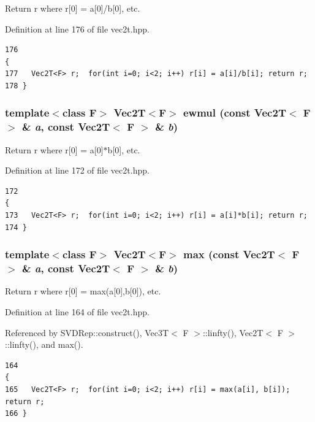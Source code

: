 Return r where r[0] = a[0]/b[0], etc. 

Definition at line 176 of file vec2t.hpp.

\footnotesize\begin{verbatim}176                                                                               { 
177   Vec2T<F> r;  for(int i=0; i<2; i++) r[i] = a[i]/b[i]; return r;
178 }
\end{verbatim}\normalsize 


\subsubsection{\setlength{\rightskip}{0pt plus 5cm}template$<$class F$>$ {\bf Vec2T}$<$F$>$ ewmul (const {\bf Vec2T}$<$ F $>$ \& {\em a}, const {\bf Vec2T}$<$ F $>$ \& {\em b})\hspace{0.3cm}{\tt  [inline]}}\label{vec2t_8hpp_77e0a16eb77d5befc68fcfea9239ad84_77e0a16eb77d5befc68fcfea9239ad84}


Return r where r[0] = a[0]$\ast$b[0], etc. 

Definition at line 172 of file vec2t.hpp.

\footnotesize\begin{verbatim}172                                                                               {
173   Vec2T<F> r;  for(int i=0; i<2; i++) r[i] = a[i]*b[i]; return r;
174 }
\end{verbatim}\normalsize 


\subsubsection{\setlength{\rightskip}{0pt plus 5cm}template$<$class F$>$ {\bf Vec2T}$<$F$>$ max (const {\bf Vec2T}$<$ F $>$ \& {\em a}, const {\bf Vec2T}$<$ F $>$ \& {\em b})\hspace{0.3cm}{\tt  [inline]}}\label{vec2t_8hpp_a5cda99c3c4530b53fe964ce3988088d_a5cda99c3c4530b53fe964ce3988088d}


Return r where r[0] = max(a[0],b[0]), etc. 

Definition at line 164 of file vec2t.hpp.

Referenced by SVDRep::construct(), Vec3T$<$ F $>$::linfty(), Vec2T$<$ F $>$::linfty(), and max().

\footnotesize\begin{verbatim}164                                                                              {
165   Vec2T<F> r;  for(int i=0; i<2; i++) r[i] = max(a[i], b[i]); return r;
166 }
\end{verbatim}\normalsize 


